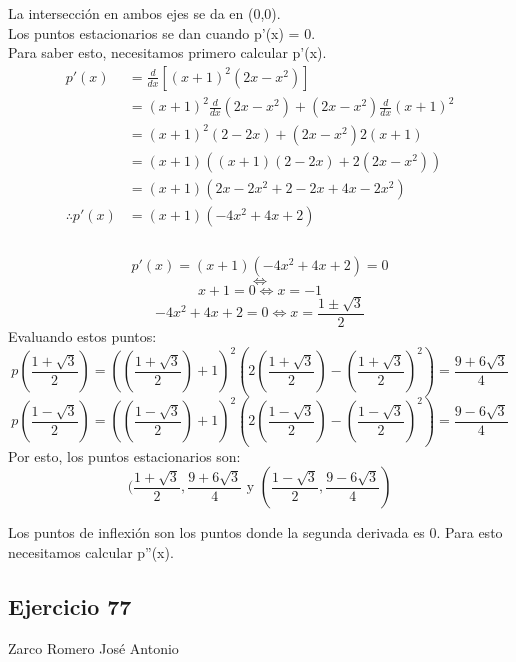 \documentclass[12pt]{article}
\begin{document}
 La intersección en ambos ejes se da en (0,0).\\

 Los puntos estacionarios se dan cuando p'(x) = 0.\\
 Para saber esto, necesitamos primero calcular p'(x).\\
 \begin{equation*}
  \begin{split}
    p'(x)
    &=  \frac{d} {dx} \left[ (x + 1)^2 (2x-x^2)\right]  \\
    &=   (x + 1)^2  \frac{d} {dx}(2x-x^2) + (2x-x^2) \frac{d} {dx} (x + 1)^2  \\
    &=   (x + 1)^2 (2-2x) + (2x-x^2)  2(x + 1)  \\
    &=   (x + 1) \left(  (x + 1) (2-2x)  +  2(2x-x^2)  \right) \\
    &=   (x + 1) \left(  2x-2x^{2}+2-2x  +  4x-2x^2  \right) \\
    \therefore
    p'(x)
    &=    (x + 1)\left(  -4x^{2} +4x+2\right) \\ \\
  \end{split}
 \end{equation*}


 \[
  p'(x) =    (x + 1)\left(  -4x^{2} +4x+2\right) = 0
  \]
  \[
  \iff
  \]
   \[
  x + 1  = 0 \iff x =-1
  \]
   \[
 -4x^{2} +4x+2  = 0 \iff x = \frac{1 \pm \sqrt{3} }{2}
 \]
 Evaluando estos puntos:
 \[
  p(\frac{1 + \sqrt{3} }{2}) = \left( \left( \frac{1 + \sqrt{3} }{2}\right) + 1 \right)^2 \left(2\left( \frac{1 + \sqrt{3} }{2} \right)- \left( \frac{1 + \sqrt{3} }{2} \right) ^2 \right) = \frac{9+6\sqrt{3}}{4}
  \]
   \[
  p(\frac{1 - \sqrt{3} }{2}) = \left( \left( \frac{1 - \sqrt{3} }{2}\right) + 1 \right)^2 \left(2\left( \frac{1 - \sqrt{3} }{2} \right)- \left( \frac{1 - \sqrt{3} }{2} \right) ^2 \right) = \frac{9-6\sqrt{3}}{4}
  \]
    Por esto, los puntos estacionarios son:
  \[
(\frac{1 + \sqrt{3} }{2},  \frac{9+6\sqrt{3}}{4} \text{  y  }
(\frac{1 - \sqrt{3} }{2}, \frac{9-6\sqrt{3}}{4} )
  \]

Los puntos de inflexión son los puntos donde la segunda derivada es 0. Para esto necesitamos calcular p''(x).
\subsection{Ejercicio 77} Zarco Romero José Antonio \\
\end{document}
